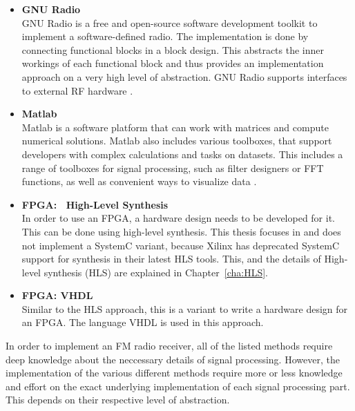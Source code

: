 \begin{itemize}
  \item \textbf{GNU Radio}\\
      GNU Radio is a free and open-source software development toolkit to implement a software-defined radio.
      The implementation is done by connecting functional blocks in a block design.
      This abstracts the inner workings of each functional block and thus provides an implementation approach on a very high level of abstraction.
      GNU Radio supports interfaces to external RF hardware \cite{SoftwareGnuRadio}.
  \item \textbf{Matlab}\\
      Matlab is a software platform that can work with matrices and compute numerical solutions.
      Matlab also includes various toolboxes, that support developers with complex calculations and tasks on datasets.
      This includes a range of toolboxes for signal processing, such as filter designers or FFT functions, as well as convenient ways to visualize data \cite{SoftwareMatlab}.
  \item \textbf{FPGA: \cplusplus\ High-Level Synthesis}\\
      In order to use an FPGA, a hardware design needs to be developed for it.
      This can be done using high-level synthesis.
      This thesis focuses in \cplusplus and does not implement a SystemC variant, because Xilinx has deprecated SystemC support for synthesis in their latest HLS tools.
      This, and the details of High-level synthesis (HLS) are explained in Chapter~\ref{cha:HLS}.

  \item \textbf{FPGA: VHDL}\\
      Similar to the HLS approach, this is a variant to write a hardware design for an FPGA.
      The language VHDL is used in this approach.
\end{itemize}

In order to implement an FM radio receiver, all of the listed methods require deep knowledge about the neccessary details of signal processing.
However, the implementation of the various different methods require more or less knowledge and effort on the exact underlying implementation of each signal processing part.
This depends on their respective level of abstraction.


